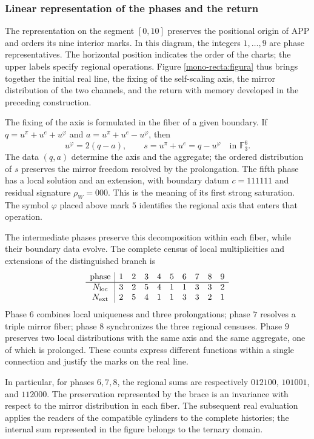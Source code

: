 \subsubsection{Linear representation of the phases and the return}
\label{mono-recta:desarrollo}

The representation on the segment \([0,10]\) preserves the positional
origin of APP and orders its nine interior marks. In this diagram,
the integers \(1,\ldots,9\) are phase representatives. The horizontal
position indicates the order of the charts; the upper labels specify
regional operations. Figure \ref{mono-recta:figura} thus brings together
the initial real line, the fixing of the self-scaling axis, the mirror
distribution of the two channels, and the return with memory developed
in the preceding construction.



The fixing of the axis is formulated in the fiber of a given boundary. If
\(q=u^\pi+u^e+u^\varphi\) and
\(a=u^\pi+u^e-u^\varphi\), then
\[
 u^\varphi=2(q-a),\qquad s=u^\pi+u^e=q-u^\varphi
 \quad\text{in }\mathbb F_3^6.
\]
The data \((q,a)\) determine the axis and the aggregate; the ordered
distribution of \(s\) preserves the mirror freedom resolved by the
prolongation. The fifth phase has a local solution and an extension, with
boundary datum \(c=111111\) and residual signature \(\rho_W=000\). This is
the meaning of its first strong saturation. The symbol \(\varphi\)
placed above mark \(5\) identifies the regional axis that enters
that operation.

The intermediate phases preserve this decomposition within each fiber,
while their boundary data evolve. The complete census of local
multiplicities and extensions of the distinguished branch is
\[
\begin{array}{c|rrrrrrrrr}
\text{phase}&1&2&3&4&5&6&7&8&9\\\hline
N_{\rm loc}&3&2&5&4&1&1&3&3&2\\
N_{\rm ext}&2&5&4&1&1&3&3&2&1
\end{array}
\]
Phase \(6\) combines local uniqueness and three prolongations; phase
\(7\) resolves a triple mirror fiber; phase \(8\) synchronizes
the three regional censuses. Phase \(9\) preserves two local
distributions with the same axis and the same aggregate, one of which
is prolonged. These counts express different functions within a
single connection and justify the marks on the real line.

In particular, for phases \(6,7,8\), the regional sums are
respectively \(012100\), \(101001\), and \(112000\). The preservation
represented by the brace is an invariance with respect to the mirror
distribution in each fiber. The subsequent real evaluation applies the
readers of the compatible cylinders to the complete histories; the
internal sum represented in the figure belongs to the ternary domain.

